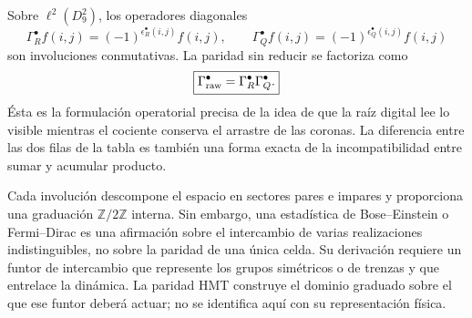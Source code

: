 Sobre \(\ell^2(D_9^2)\), los operadores diagonales
\[
 \Gamma_R^\bullet f(i,j)
 =(-1)^{\epsilon_R^\bullet(i,j)}f(i,j),
 \qquad
 \Gamma_Q^\bullet f(i,j)
 =(-1)^{\epsilon_Q^\bullet(i,j)}f(i,j)
\]
son involuciones conmutativas. La paridad sin reducir se factoriza como
\[
 \boxed{\Gamma_{\rm raw}^\bullet
 =\Gamma_R^\bullet\Gamma_Q^\bullet.}
\]
Ésta es la formulación operatorial precisa de la idea de que la raíz digital
lee lo visible mientras el cociente conserva el arrastre de las coronas. La
diferencia entre las dos filas de la tabla es también una forma exacta de la
incompatibilidad entre sumar y acumular producto.

Cada involución descompone el espacio en sectores pares e impares y proporciona
una graduación \(\mathbb Z/2\mathbb Z\) interna. Sin embargo, una estadística
de Bose--Einstein o Fermi--Dirac es una afirmación sobre el intercambio de
varias realizaciones indistinguibles, no sobre la paridad de una única celda.
Su derivación requiere un funtor de intercambio que represente los grupos
simétricos o de trenzas y que entrelace la dinámica. La paridad HMT construye
el dominio graduado sobre el que ese funtor deberá actuar; no se identifica
aquí con su representación física.

